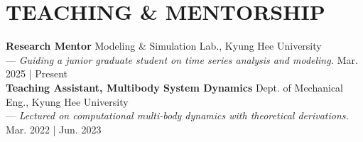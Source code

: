 \documentclass[a4paper,10pt]{extarticle}
\begin{document}
\section*{TEACHING \& MENTORSHIP}
\textbf{Research Mentor} \hfill Modeling \& Simulation Lab., Kyung Hee University\\
--- \textsl{Guiding a junior graduate student on time series analysis and modeling.} \hfill Mar. 2025 | Present\\ %
\textbf{Teaching Assistant, Multibody System Dynamics} \hfill Dept. of Mechanical Eng., Kyung Hee University\\
--- \textsl{Lectured on computational multi-body dynamics with  theoretical derivations.} \hfill Mar. 2022 | Jun. 2023 %


\end{document}
